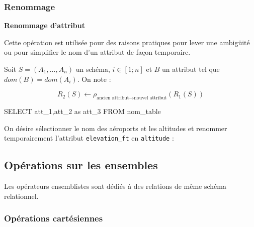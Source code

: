 \documentclass[10pt]{article}
\newif\ifprof
\begin{document}
\subsubsection{Renommage}
\begin{defi}
\textbf{Renommage d'attribut}

Cette opération est utilisée pour des raisons pratiques pour lever une ambigüité ou pour simplifier le nom d'un attribut de façon temporaire. 

Soit $S = (A_1,... ,A_n)$ un schéma, $ i \in[1;n]$ et $B$ un attribut tel que
$dom(B) = dom(A_i)$. On note :

$$
R_2 (S)\leftarrow \rho_{\text{ancien attribut} \rightarrow \text{nouvel attribut}}(R_1(S))
$$

\begin{envsql}
\begin{sql}
SELECT att_1,att_2 as att_3 FROM nom_table
\end{sql}
\end{envsql}

\end{defi}


\begin{exemple}
On désire sélectionner le nom des aéroports et les altitudes et  renommer temporairement l'attribut \texttt{elevation\_ft} en \texttt{altitude} :
\ifprof
$$
\pi_{\text{elevation\_ft}}\left(\rho_{\text{elevation\_ft} \rightarrow \text{altitude}}(\text{airports})\right)
$$
\begin{envsql}
\begin{sql}
SELECT name, elevation_ft AS altitude FROM airports;
\end{sql}
\end{envsql}
\else
\vspace{3cm}
\fi

\end{exemple}




\subsection{Opérations sur les ensembles}
\begin{rem}
Les opérateurs ensemblistes sont dédiés à des relations de même schéma relationnel. 
\end{rem}


\subsubsection{Opérations cartésiennes}
\end{document}

